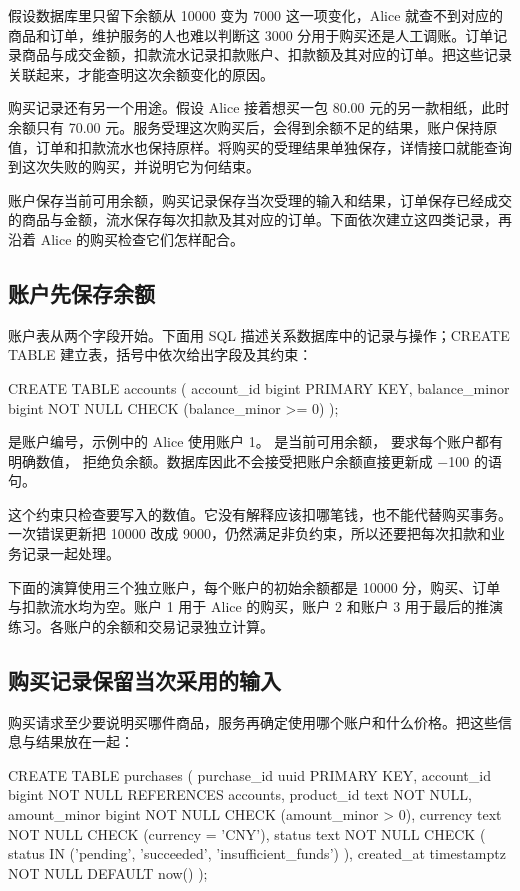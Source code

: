 假设数据库里只留下余额从 10000 变为 7000 这一项变化，Alice 就查不到对应的商品和订单，维护服务的人也难以判断这 3000 分用于购买还是人工调账。订单记录商品与成交金额，扣款流水记录扣款账户、扣款额及其对应的订单。把这些记录关联起来，才能查明这次余额变化的原因。

购买记录还有另一个用途。假设 Alice 接着想买一包 80.00 元的另一款相纸，此时余额只有 70.00 元。服务受理这次购买后，会得到余额不足的结果，账户保持原值，订单和扣款流水也保持原样。将购买的受理结果单独保存，详情接口就能查询到这次失败的购买，并说明它为何结束。

账户保存当前可用余额，购买记录保存当次受理的输入和结果，订单保存已经成交的商品与金额，流水保存每次扣款及其对应的订单。下面依次建立这四类记录，再沿着 Alice 的购买检查它们怎样配合。

\subsection*{账户先保存余额}

账户表从两个字段开始。下面用 SQL 描述关系数据库中的记录与操作；CREATE TABLE 建立表，括号中依次给出字段及其约束：

\begin{BookCode}
CREATE TABLE accounts (
    account_id    bigint PRIMARY KEY,
    balance_minor bigint NOT NULL
        CHECK (balance_minor >= 0)
);
\end{BookCode}

 是账户编号，示例中的 Alice 使用账户 1。 是当前可用余额， 要求每个账户都有明确数值， 拒绝负余额。数据库因此不会接受把账户余额直接更新成 \ensuremath{-}100 的语句。

这个约束只检查要写入的数值。它没有解释应该扣哪笔钱，也不能代替购买事务。一次错误更新把 10000 改成 9000，仍然满足非负约束，所以还要把每次扣款和业务记录一起处理。

下面的演算使用三个独立账户，每个账户的初始余额都是 10000 分，购买、订单与扣款流水均为空。账户 1 用于 Alice 的购买，账户 2 和账户 3 用于最后的推演练习。各账户的余额和交易记录独立计算。

\subsection*{购买记录保留当次采用的输入}

购买请求至少要说明买哪件商品，服务再确定使用哪个账户和什么价格。把这些信息与结果放在一起：

\begin{BookCode}
CREATE TABLE purchases (
    purchase_id   uuid PRIMARY KEY,
    account_id    bigint NOT NULL REFERENCES accounts,
    product_id    text NOT NULL,
    amount_minor  bigint NOT NULL CHECK (amount_minor > 0),
    currency      text NOT NULL CHECK (currency = 'CNY'),
    status        text NOT NULL CHECK (
        status IN ('pending', 'succeeded', 'insufficient_funds')
    ),
    created_at    timestamptz NOT NULL DEFAULT now()
);
\end{BookCode}

